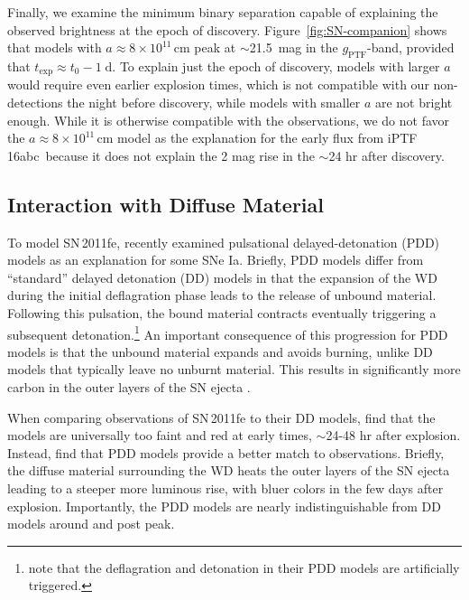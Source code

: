 \documentclass[twocolumn]{aastex61}
\newcommand{\abc}{iPTF\,16abc}
\begin{document}
Finally, we examine the minimum binary separation capable of explaining the observed brightness at the epoch of discovery. Figure~\ref{fig:SN-companion} shows that models with $a \approx 8 \times 10^{11} \, \mathrm{cm}$ peak at $\sim$21.5~mag in the $g_\mathrm{PTF}$-band, provided that $t_\mathrm{exp} \approx t_0 - 1 \; \mathrm{d}$. To explain just the epoch of discovery, models with larger $a$ would require even earlier explosion times, which is not compatible with our non-detections the night before discovery, while models with smaller $a$ are not bright enough. While it is otherwise compatible with the observations, we do not favor the $a \approx 8 \times 10^{11} \, \mathrm{cm}$ model as the explanation for the early flux from \abc\ because it does not explain the 2 mag rise in the $\sim$24 hr after discovery. 

\subsection{Interaction with Diffuse Material}

To model SN\,2011fe, \citet{2014MNRAS.441..532D} recently examined pulsational delayed-detonation (PDD) models as an explanation for some SNe Ia. Briefly, PDD models differ from ``standard'' delayed detonation (DD) models in that the expansion of the WD during the initial deflagration phase leads to the release of unbound material. Following this pulsation, the bound material contracts eventually triggering a subsequent detonation.\footnote{\citet{2014MNRAS.441..532D} note that the deflagration and detonation in their PDD models are artificially triggered.} An important consequence of this progression for PDD models is that the unbound material expands and avoids burning, unlike DD models that typically leave no unburnt material. This results in significantly more carbon in the outer layers of the SN ejecta \citep{2014MNRAS.441..532D}.

When comparing observations of SN\,2011fe to their DD models, \citet{2014MNRAS.441..532D} find that the models are universally too faint and red at early times, $\sim$24-48 hr after explosion.  Instead, \citet{2014MNRAS.441..532D} find that PDD models provide a better match to observations. Briefly, the diffuse material surrounding the WD heats the outer layers of the SN ejecta leading to a steeper more luminous rise, with bluer colors in the few days after explosion. Importantly, the PDD models are nearly indistinguishable from DD models around and post peak. 
\end{document}
